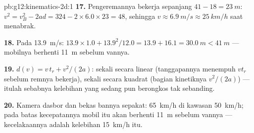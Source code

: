 \begin{solution}{pb:g12:kinematics-2d:1}
\textbf{17.} Pengeremannya bekerja sepanjang $41 - 18 = \qty{23}{m}$:
$v^2 = v_B^2 - 2ad = 324 - 2 \times 6.0 \times 23 = 48$, sehingga
$v \approx \qty{6.9}{m/s} \approx \qty{25}{km/h}$ saat menabrak.

\textbf{18.} Pada \qty{13.9}{m/s}: $13.9 \times 1.0 + 13.9^2/12.0 =
13.9 + 16.1 = \qty{30.0}{m} < \qty{41}{m}$ --- mobilnya berhenti
\qty{11}{m} sebelum vannya.

\textbf{19.} $d(v) = v\,t_r + v^2/(2a)$: sekali secara linear
(tanggapannya menempuh $v t_r$ sebelum remnya bekerja), sekali secara
kuadrat (bagian kinetiknya $v^2/(2a)$) --- itulah sebabnya kelebihan
yang sedang pun berongkos tak sebanding.

\textbf{20.} Kamera dasbor dan bekas bannya sepakat: \qty{65}{km/h} di
kawasan \qty{50}{km/h}; pada batas kecepatannya mobil itu akan berhenti
\qty{11}{m} sebelum vannya --- kecelakaannya adalah kelebihan
\qty{15}{km/h} itu.
\end{solution}
